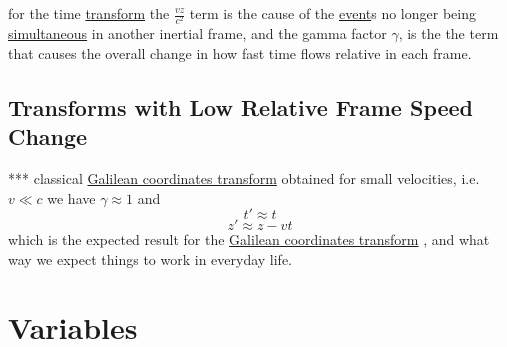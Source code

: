 for the time \hyperlink{def-transform}{transform} the $\frac{vz}{c^2}$ term is the cause of the \hyperlink{def-event}{event}s no longer being \hyperlink{def-simultaneity}{simultaneous} in another inertial frame, and the gamma factor $\gamma$, is the the term that causes the overall change in how fast time flows relative in each frame.


\subsection{Transforms with Low Relative Frame Speed Change}
*** classical \hyperlink{def-galilean-transform}{Galilean coordinates transform} obtained for small velocities, i.e. $v\ll c$ we have $\gamma \approx 1$ and
\begin{equation}%
    t' \approx t
\end{equation}%
\begin{equation}%
    z' \approx z - vt
\end{equation}%
which is the expected result for the \hyperlink{def-galilean-transform}{Galilean coordinates transform} , and what way we expect things to work in everyday life. 

\section{Variables}



